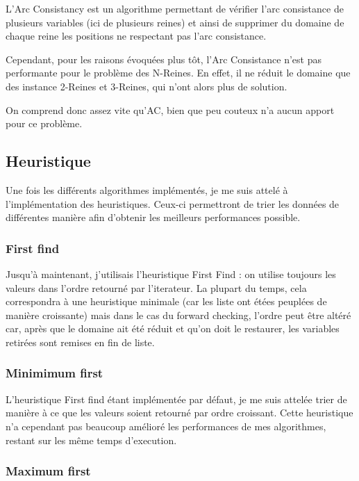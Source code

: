 \documentclass[a4paper,10pt]{article}
\begin{document}
L'Arc Consistancy est un algorithme permettant de vérifier l'arc consistance de plusieurs variables (ici de plusieurs reines) et ainsi de supprimer du domaine de chaque reine les positions ne respectant pas l'arc consistance.

Cependant, pour les raisons évoquées plus tôt, l'Arc Consistance n'est pas performante pour le problème des N-Reines. En effet, il ne réduit le domaine que des instance 2-Reines et 3-Reines, qui n'ont alors plus de solution.

On comprend donc assez vite qu'AC, bien que peu couteux n'a aucun apport pour ce problème.

\subsection{Heuristique}

Une fois les différents algorithmes implémentés, je me suis attelé à l'implémentation des heuristiques. Ceux-ci permettront de trier les données de différentes manière afin d'obtenir les meilleurs performances possible.

\subsubsection{First find}

Jusqu'à maintenant, j'utilisais l'heuristique First Find : on utilise toujours les valeurs dans l'ordre retourné par l'iterateur. La plupart du temps, cela correspondra à une heuristique minimale (car les liste ont étées peuplées de manière croissante) mais dans le cas du forward checking, l'ordre peut être altéré car, après que le domaine ait été réduit et qu'on doit le restaurer, les variables retirées sont remises en fin de liste.

\subsubsection{Minimimum first}

L'heuristique First find étant implémentée par défaut, je me suis attelée trier de manière à ce que les valeurs soient retourné par ordre croissant. Cette heuristique n'a cependant pas beaucoup amélioré les performances de mes algorithmes, restant sur les même temps d'execution. 

\subsubsection{Maximum first}
\end{document}
